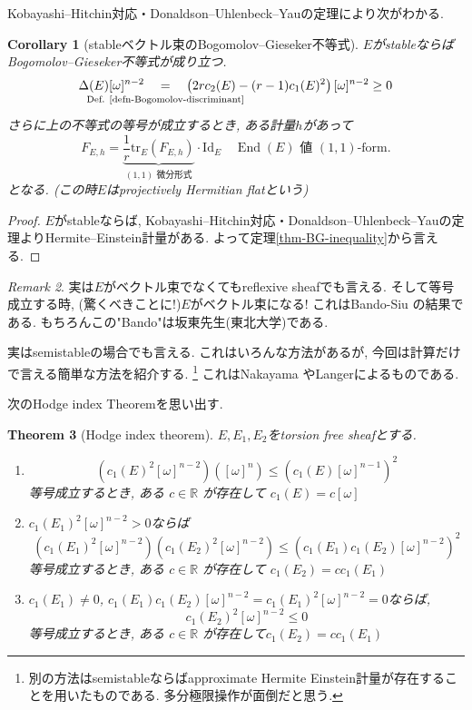 \documentclass[dvipdfmx,a4paper,11pt]{article} %
\newtheorem{thm}{Theorem}[section]
\newtheorem{cor}[thm]{Corollary}
\theoremstyle{definition}
\theoremstyle{remark}
\newtheorem{rem}[thm]{Remark}
\numberwithin{equation}{section}
\newcommand{\End}[0]{\operatorname{End}}
\newcommand{\underalign}[2]{\quad \underset{\mathclap{\strut #1}}{#2}\quad}
\begin{document}
Kobayashi--Hitchin対応・Donaldson--Uhlenbeck--Yauの定理により次がわかる.
\begin{cor}[stableベクトル束のBogomolov--Gieseker不等式]
\label{cor-BG-inequality}
$E$がstableならばBogomolov--Gieseker不等式が成り立つ. 
$$
\Delta(E) [\omega]^{n-2}
\underalign{\text{Def. \ref{defn-Bogomolov-discriminant}}}{=}
\left(2r c_2(E)-(r-1)c_1(E)^2\right)[\omega]^{n-2}
\ge 0
$$
さらに上の不等式の等号が成立するとき, ある計量$h$があって
$$
F_{E,h} = \underbrace{\frac{1}{r} \mathrm{tr}_{E}(F_{E,h})}_{\text{\((1,1)\) 微分形式}}\cdot \mathrm{Id}_{E}
\quad \text{\(\End(E)\) 値 \((1,1)\)-form}.
$$
となる. (この時$E$はprojectively Hermitian flatという)
\end{cor}
\begin{proof}
$E$がstableならば, Kobayashi--Hitchin対応・Donaldson--Uhlenbeck--Yauの定理よりHermite--Einstein計量がある. よって定理\ref{thm-BG-inequality}から言える.
\end{proof}
\begin{rem}
実は$E$がベクトル束でなくてもreflexive sheafでも言える. そして等号成立する時, (驚くべきことに!)$E$がベクトル束になる!
これはBando-Siu \cite{BS94}の結果である. もちろんこの"Bando"は坂東先生(東北大学)である.
\end{rem}


実はsemistableの場合でも言える. 
これはいろんな方法があるが, 今回は計算だけで言える簡単な方法を紹介する. \footnote{別の方法はsemistableならばapproximate Hermite Einstein計量が存在することを用いたものである. 多分極限操作が面倒だと思う.}
これはNakayama \cite{Nak04}やLanger\cite{Lan04}によるものである. 

次のHodge index Theoremを思い出す. 

\begin{thm}[Hodge index theorem]
\label{thm-hodge-index}
$E, E_1, E_2$をtorsion free sheafとする. 
\begin{enumerate}
\item
\[
\left(c_1(E)^2 [\omega]^{n-2}\right)
\left([\omega]^{n}\right)
\le
\left(c_1(E) [\omega]^{n-1}\right)^2
\]
 等号成立するとき,  ある \(c\in\mathbb{R}\) が存在して
$c_1(E)=c[\omega]$
\item $c_1(E_1)^2 [\omega]^{n-2}>0$ならば
\[
\left(c_1(E_1)^2 [\omega]^{n-2}\right)
\left(c_1(E_2)^2 [\omega]^{n-2}\right)
\le
\left(c_1(E_1)c_1(E_2) [\omega]^{n-2}\right)^2
\]
 等号成立するとき,  ある \(c\in\mathbb{R}\) が存在して
$c_1(E_2)=cc_1(E_1)$
\item $c_1(E_1)\neq0$, $c_1(E_1)c_1(E_2) [\omega]^{n-2}=c_1(E_1)^2 [\omega]^{n-2}=0$ならば, 
\[c_1(E_2)^2 [\omega]^{n-2}\leq 0\]
 等号成立するとき, ある \(c\in\mathbb{R}\) が存在して$c_1(E_2)=cc_1(E_1)$
\end{enumerate}
\end{thm}
\end{document}
